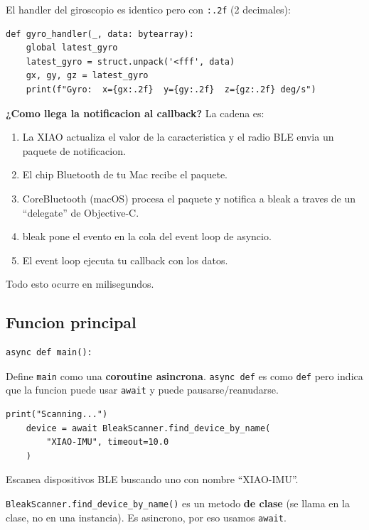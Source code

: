 \documentclass[11pt,a4paper]{article}
\begin{document}
El handler del giroscopio es identico pero con \texttt{:.2f}
(2 decimales):

\begin{lstlisting}[style=python]
def gyro_handler(_, data: bytearray):
    global latest_gyro
    latest_gyro = struct.unpack('<fff', data)
    gx, gy, gz = latest_gyro
    print(f"Gyro:  x={gx:.2f}  y={gy:.2f}  z={gz:.2f} deg/s")
\end{lstlisting}

\textbf{¿Como llega la notificacion al callback?} La cadena es:
\begin{enumerate}
    \item La XIAO actualiza el valor de la caracteristica y el radio
          BLE envia un paquete de notificacion.
    \item El chip Bluetooth de tu Mac recibe el paquete.
    \item CoreBluetooth (macOS) procesa el paquete y notifica a
          bleak a traves de un ``delegate'' de Objective-C.
    \item bleak pone el evento en la cola del event loop de asyncio.
    \item El event loop ejecuta tu callback con los datos.
\end{enumerate}

Todo esto ocurre en milisegundos.

\subsection{Funcion principal}

\begin{lstlisting}[style=python]
async def main():
\end{lstlisting}

Define \texttt{main} como una \textbf{coroutine asincrona}.
\texttt{async def} es como \texttt{def} pero indica que la funcion
puede usar \texttt{await} y puede pausarse/reanudarse.

\begin{lstlisting}[style=python]
    print("Scanning...")
    device = await BleakScanner.find_device_by_name(
        "XIAO-IMU", timeout=10.0
    )
\end{lstlisting}

Escanea dispositivos BLE buscando uno con nombre ``XIAO-IMU''.

\texttt{BleakScanner.find\_device\_by\_name()} es un metodo
\textbf{de clase} (se llama en la clase, no en una instancia). Es
asincrono, por eso usamos \texttt{await}.
\end{document}
